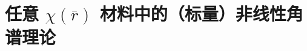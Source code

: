 \chapter{任意 \texorpdfstring{$\chi ( \bar{r} )$}{$\text{χ} ( \bar{r} )$} 材料中的（标量）非线性角谱理论}\label{chap:NLAST}

